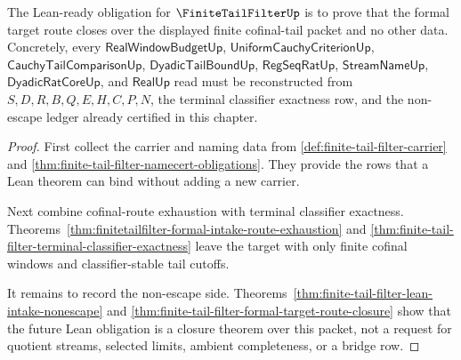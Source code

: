 \begin{theorem}
\label{thm:finite-tail-filter-lean-ready-obligation-surface}
The Lean-ready obligation for $\FiniteTailFilterUp$ is to prove that the formal target route closes over the displayed finite cofinal-tail packet and no other data. Concretely, every $\mathsf{RealWindowBudgetUp}$, $\mathsf{UniformCauchyCriterionUp}$, $\mathsf{CauchyTailComparisonUp}$, $\mathsf{DyadicTailBoundUp}$, $\mathsf{RegSeqRatUp}$, $\mathsf{StreamNameUp}$, $\mathsf{DyadicRatCoreUp}$, and $\mathsf{RealUp}$ read must be reconstructed from $S,D,R,B,Q,E,H,C,P,N$, the terminal classifier exactness row, and the non-escape ledger already certified in this chapter.
\end{theorem}
\begin{proof}
First collect the carrier and naming data from \autoref{def:finite-tail-filter-carrier} and \autoref{thm:finite-tail-filter-namecert-obligations}. They provide the rows that a Lean theorem can bind without adding a new carrier.

Next combine cofinal-route exhaustion with terminal classifier exactness. Theorems~\ref{thm:finitetailfilter-formal-intake-route-exhaustion} and \ref{thm:finite-tail-filter-terminal-classifier-exactness} leave the target with only finite cofinal windows and classifier-stable tail cutoffs.

It remains to record the non-escape side. Theorems~\ref{thm:finite-tail-filter-lean-intake-nonescape} and \ref{thm:finite-tail-filter-formal-target-route-closure} show that the future Lean obligation is a closure theorem over this packet, not a request for quotient streams, selected limits, ambient completeness, or a bridge row.
\end{proof}


